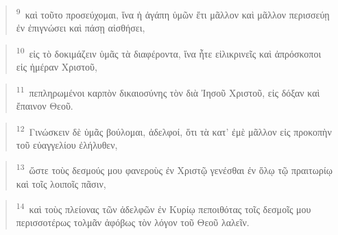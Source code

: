 \documentclass{article}
\newcommand{\currentverse}{1} %
\newcommand{\setcurrentverse}[1]{\renewcommand{\currentverse}{#1}}
\begin{document}
\begin{verse}

\setcurrentverse{9}

\setcounter{footnote}{0}

\textsuperscript{9}~καὶ τοῦτο προσεύχομαι, ἵνα ἡ ἀγάπη ὑμῶν ἔτι μᾶλλον καὶ μᾶλλον περισσεύῃ ἐν ἐπιγνώσει καὶ πάσῃ αἰσθήσει,

\end{verse}

\begin{verse}

\setcurrentverse{10}

\setcounter{footnote}{0}

\textsuperscript{10}~εἰς τὸ δοκιμάζειν ὑμᾶς τὰ διαφέροντα, ἵνα ἦτε εἰλικρινεῖς καὶ ἀπρόσκοποι εἰς ἡμέραν Χριστοῦ,

\end{verse}

\begin{verse}

\setcurrentverse{11}

\setcounter{footnote}{0}

\textsuperscript{11}~πεπληρωμένοι καρπὸν δικαιοσύνης τὸν διὰ Ἰησοῦ Χριστοῦ, εἰς δόξαν καὶ ἔπαινον Θεοῦ.

\end{verse}

\begin{verse}

\setcurrentverse{12}

\setcounter{footnote}{0}

\textsuperscript{12}~Γινώσκειν δὲ ὑμᾶς βούλομαι, ἀδελφοί, ὅτι τὰ κατ’ ἐμὲ μᾶλλον εἰς προκοπὴν τοῦ εὐαγγελίου ἐλήλυθεν,

\end{verse}

\begin{verse}

\setcurrentverse{13}

\setcounter{footnote}{0}

\textsuperscript{13}~ὥστε τοὺς δεσμούς μου φανεροὺς ἐν Χριστῷ γενέσθαι ἐν ὅλῳ τῷ πραιτωρίῳ καὶ τοῖς λοιποῖς πᾶσιν,

\end{verse}

\begin{verse}

\setcurrentverse{14}

\setcounter{footnote}{0}

\textsuperscript{14}~καὶ τοὺς πλείονας τῶν ἀδελφῶν ἐν Κυρίῳ πεποιθότας τοῖς δεσμοῖς μου περισσοτέρως τολμᾶν ἀφόβως τὸν λόγον τοῦ Θεοῦ λαλεῖν.

\end{verse}
\end{document}
